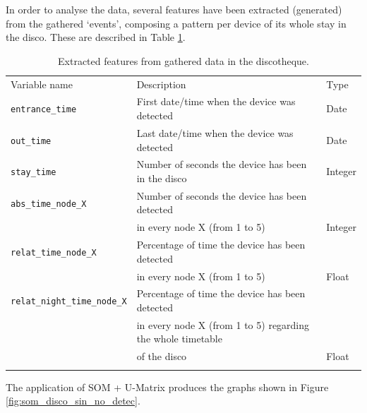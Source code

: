 \documentclass[preprint]{elsarticle}
\begin{document}
In order to analyse the data, several features have been extracted (generated) from the gathered `events', composing a pattern per device of its whole stay in the disco. These are described in Table \ref{tab:extracted_features_disco}.

\begin{table}[htpb]
\centering
{\scriptsize
\begin{tabular}{lll}
\hline\noalign{\smallskip}
Variable name & Description & Type\\
\noalign{\smallskip}\hline\noalign{\smallskip}
\texttt{entrance\_time} & First date/time when the device was detected & Date\\
\texttt{out\_time} & Last date/time when the device was detected  & Date\\
\texttt{stay\_time} & Number of seconds the device has been in the disco & Integer\\
\texttt{abs\_time\_node\_X} & Number of seconds the device has been detected\\
& in every node X (from 1 to 5) & Integer\\
\texttt{relat\_time\_node\_X} & Percentage of time the device has been detected\\
& in every node X (from 1 to 5) & Float\\
\texttt{relat\_night\_time\_node\_X} & Percentage of time the device has been detected\\
& in every node X (from 1 to 5) regarding the whole timetable\\
& of the disco & Float\\
\noalign{\smallskip}\hline
\end{tabular}
 \caption{Extracted features from gathered data in the discotheque. \label{tab:extracted_features_disco}}
}
\end{table}


The application of SOM + U-Matrix produces the graphs shown in Figure
\ref{fig:som_disco_sin_no_detec}.

\end{document}
